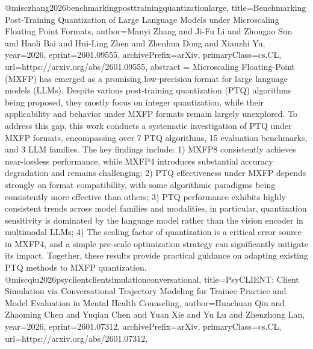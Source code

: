{}@misc{zhang2026benchmarkingposttrainingquantizationlarge,
      title={Benchmarking Post-Training Quantization of Large Language Models under Microscaling Floating Point Formats}, 
      author={Manyi Zhang and Ji-Fu Li and Zhongao Sun and Haoli Bai and Hui-Ling Zhen and Zhenhua Dong and Xianzhi Yu},
      year={2026},
      eprint={2601.09555},
      archivePrefix={arXiv},
      primaryClass={cs.CL},
      url={https://arxiv.org/abs/2601.09555},
      abstract = {Microscaling Floating-Point (MXFP) has emerged as a promising low-precision format for large language models (LLMs). Despite various post-training quantization (PTQ) algorithms being proposed, they mostly focus on integer quantization, while their applicability and behavior under MXFP formats remain largely unexplored. To address this gap, this work conducts a systematic investigation of PTQ under MXFP formats, encompassing over 7 PTQ algorithms, 15 evaluation benchmarks, and 3 LLM families. The key findings include: 1) MXFP8 consistently achieves near-lossless performance, while MXFP4 introduces substantial accuracy degradation and remains challenging; 2) PTQ effectiveness under MXFP depends strongly on format compatibility, with some algorithmic paradigms being consistently more effective than others; 3) PTQ performance exhibits highly consistent trends across model families and modalities, in particular, quantization sensitivity is dominated by the language model rather than the vision encoder in multimodal LLMs; 4) The scaling factor of quantization is a critical error source in MXFP4, and a simple pre-scale optimization strategy can significantly mitigate its impact. Together, these results provide practical guidance on adapting existing PTQ methods to MXFP quantization.}
}@misc{qiu2026psyclientclientsimulationconversational,
      title={PsyCLIENT: Client Simulation via Conversational Trajectory Modeling for Trainee Practice and Model Evaluation in Mental Health Counseling}, 
      author={Huachuan Qiu and Zhaoming Chen and Yuqian Chen and Yuan Xie and Yu Lu and Zhenzhong Lan},
      year={2026},
      eprint={2601.07312},
      archivePrefix={arXiv},
      primaryClass={cs.CL},
      url={https://arxiv.org/abs/2601.07312},
}
